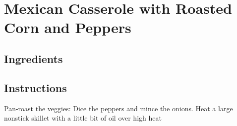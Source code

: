 \documentclass[letterpaper,10pt,english]{sphinxmanual}
\begin{document}
\chapter{Mexican Casserole with Roasted Corn and Peppers}
\label{\detokenize{Mexican_Pepper_Cassarole:mexican-casserole-with-roasted-corn-and-peppers}}\label{\detokenize{Mexican_Pepper_Cassarole::doc}}

\section{Ingredients}
\label{\detokenize{Mexican_Pepper_Cassarole:ingredients}}
%
\begin{sphinxVerbatim}[commandchars=\\\{\}]
   

   

           

  

   

   

  

      

   

  

   

    

      
\end{sphinxVerbatim}


\section{Instructions}
\label{\detokenize{Mexican_Pepper_Cassarole:instructions}}
Pan-roast the veggies: Dice the peppers and mince the onions. Heat a large nonstick skillet with a little bit of oil over high heat
\end{document}
